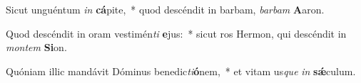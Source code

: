 \item Sicut unguéntum \textit{in} \textbf{cá}pite,~* quod descéndit in barbam, \textit{bar}\textit{bam} \textbf{A}aron.
\item Quod descéndit in oram vestimén\textit{ti} \textbf{e}jus:~* sicut ros Hermon, qui descéndit in \textit{mon}\textit{tem} \textbf{Si}on.
\item Quóniam illic mandávit Dóminus benedic\textit{ti}\textbf{ó}nem,~* et vitam us\textit{que} \textit{in} \textbf{sǽ}culum.
